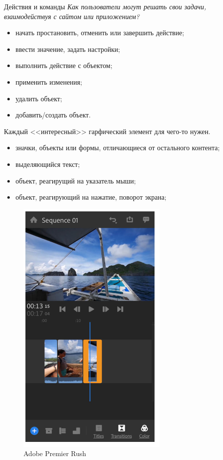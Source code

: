 \documentclass{beamer}
\begin{document}
\begin{frame}[t]{Действия и команды}
	\textit{Как пользователи могут решать свои задачи, взаимодействуя с сайтом или приложением?}
	\begin{itemize}
		\item начать простановить, отменить или завершить действие;
		\item ввести значение, задать настройки;
		\item выполнить действие с объектом;
		\item применить изменения;
		\item удалить объект;				 		
		\item добавить/создать объект.		
	\end{itemize}
	
	Каждый <<интересный>> гарфический элемент для чего-то нужен.
	\begin{itemize}
		\item значки, объекты или формы, отличающиеся от остального контента;
		\item выделяющийся текст;
		\item объект, реагирущий на указатель мыши;
		\item объект, реагирующий на нажатие, поворот экрана;
	\end{itemize}		
\end{frame}

\begin{frame}[t]{}
	\begin{figure}[h]
		\centering
		\includegraphics[scale=0.5]{images/lec08-pic01.png}
		\caption{Adobe Premier Rush}
	\end{figure}
\end{frame}	
\end{document}
